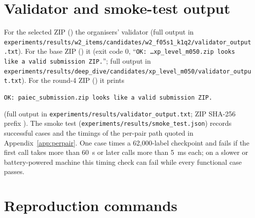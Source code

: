 \documentclass{article}
\begin{document}
\section{Validator and smoke-test output}
For the selected ZIP (\SubId) the organisers' validator \WkValidator{} (full output in \texttt{experiments/results/w2\_items/candidates/w2\_f05s1\_k1q2/validator\_output.txt}). For the base ZIP (\SelId) it \CkSelValidator{} (exit code 0, ``\texttt{OK: \dots xp\_level\_m050.zip looks like a valid submission ZIP.}''; full output in \texttt{experiments/results/deep\_dive/candidates/xp\_level\_m050/validator\_output.txt}). For the round-4 ZIP (\FmShipId) it prints
\begin{center}\texttt{OK: paiec\_submission.zip looks like a valid submission ZIP.}\end{center}
(full output in \texttt{experiments/results/validator\_output.txt}; ZIP SHA-256 prefix \texttt{\ZipShaShort}). The smoke test (\texttt{experiments/results/smoke\_test.json}) records \SmokeNCases{} successful cases and the timings of the per-pair path quoted in Appendix~\ref{app:perpair}. One case times a 62,000-label checkpoint and fails if the first call takes more than 60~s or later calls more than 5~ms each; on a slower or battery-powered machine this timing check can fail while every functional case passes.

\section{Reproduction commands}
\label{app:repro}
\end{document}

